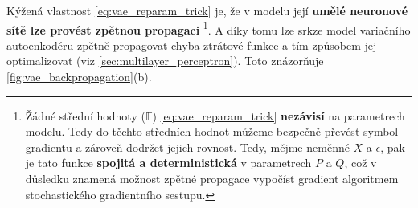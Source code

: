 Kýžená vlastnost \autoref{eq:vae_reparam_trick} je, že v modelu její \textbf{umělé neuronové sítě lze provést zpětnou propagaci}
\footnote{Žádné střední hodnoty ($\mathds{E}$) \autoref{eq:vae_reparam_trick} \textbf{nezávisí} na parametrech modelu. Tedy do těchto středních hodnot můžeme bezpečně převést symbol gradientu a zároveň dodržet jejich rovnost. 
Tedy, mějme neměnné $X$ a $\epsilon$, pak je tato funkce \textbf{spojitá a deterministická} v parametrech $P$ a $Q$, což v důsledku znamená možnost zpětné propagace vypočíst gradient algoritmem stochastického gradientního sestupu.}. 
A díky tomu lze srkze model variačního autoenkodéru zpětně propagovat chyba ztrátové funkce a tím způsobem jej optimalizovat (viz \autoref{sec:multilayer_perceptron}). Toto znázorňuje \autoref{fig:vae_backpropagation}(b). \cite{Kingma2014}
